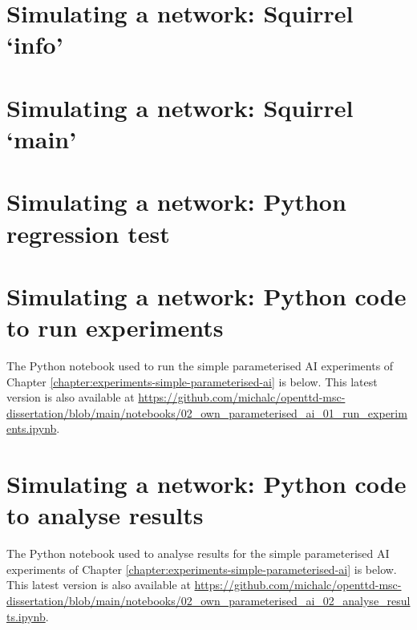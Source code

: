 \documentclass[logo,msc,dsti]{style/infthesis}    %
\begin{document}
{

\chapter{Simulating a network: Squirrel `info'}
\label{chapter:simulating-a-network-squirrel-info}



\chapter{Simulating a network: Squirrel `main'}
\label{chapter:simulating-a-network-squirrel-main}



\chapter{Simulating a network: Python regression test}
\label{chapter:simulating-a-network-python-regression-test}



\chapter{Simulating a network: Python code to run experiments}
\label{chapter:own-parameterised-ai-run-experiments}

The Python notebook used to run the simple parameterised AI experiments of Chapter \ref{chapter:experiments-simple-parameterised-ai} is below. This latest version is also available at \url{https://github.com/michalc/openttd-msc-dissertation/blob/main/notebooks/02_own_parameterised_ai_01_run_experiments.ipynb}.



\chapter{Simulating a network: Python code to analyse results}
\label{chapter:own-parameterised-ai-analyse-results}

The Python notebook used to analyse results for the simple parameterised AI experiments of Chapter \ref{chapter:experiments-simple-parameterised-ai} is below. This latest version is also available at \url{https://github.com/michalc/openttd-msc-dissertation/blob/main/notebooks/02_own_parameterised_ai_02_analyse_results.ipynb}.

}
\end{document}
